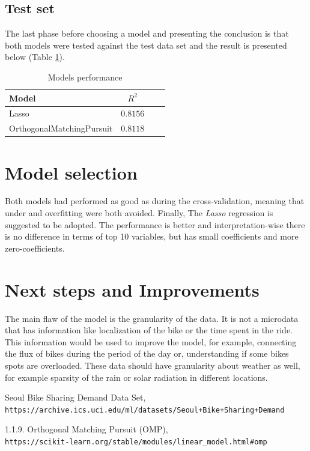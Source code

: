 \documentclass[11pt, a4]{article}
\begin{document}
\subsection*{Test set}

The last phase before choosing a model and presenting the conclusion is that both models were tested against the test data set and the result is presented below (Table \ref{table:6}).

\begin{table}[h!]
\centering
\begin{tabular}{l c c c}
\toprule
\textbf{Model} & \textbf{$R^2$} \\
\midrule
Lasso & $0.8156$ \\
OrthogonalMatchingPursuit & $0.8118$\\
\bottomrule
\end{tabular}
\caption{Models performance}
\label{table:6}
\end{table}

\section*{Model selection}

Both models had performed as good as during the cross-validation, meaning that under and overfitting were both avoided. Finally, The \textit{Lasso} regression is suggested to be adopted. The performance is better and interpretation-wise there is no difference in terms of top 10 variables, but has small coefficients and more zero-coefficients.

\section*{Next steps and Improvements}

The main flaw of the model is the granularity of the data. It is not a microdata that has information like localization of the bike or the time spent in the ride. This information would be used to improve the model, for example, connecting the flux of bikes during the period of the day or, understanding if some bikes spots are overloaded. These data should have granularity about weather as well, for example sparsity of the rain or solar radiation in different locations.



\FloatBarrier

\begin{thebibliography}{9}

Seoul Bike Sharing Demand Data Set,
\\\texttt{https://archive.ics.uci.edu/ml/datasets/Seoul+Bike+Sharing+Demand}

1.1.9. Orthogonal Matching Pursuit (OMP),
\\\texttt{https://scikit-learn.org/stable/modules/linear\_model.html\#omp}
\end{thebibliography}
\end{document}
